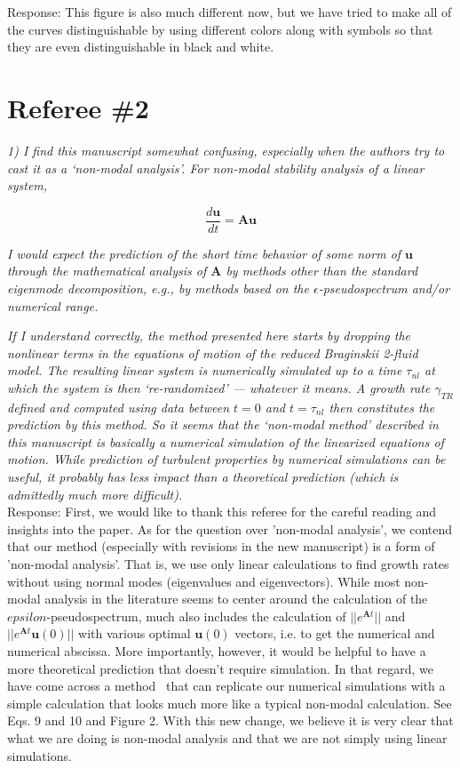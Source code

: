 \documentclass[12pt]{article}
\def\beq{\begin{equation}}
\def\eeq{\end{equation}}
\newcommand{\diff}[2]{\frac{d#1}{d#2}}
\begin{document}
Response: This figure is also much different now, but we have tried to make all of the curves distinguishable by using different colors along with symbols so that they are even distinguishable in black and white.


\section{Referee \#2}

\emph{1) I find this manuscript somewhat confusing, especially when the authors try to cast it as a ‘non-modal analysis’. For non-modal stability analysis of a linear system,}

\beq
\diff{\mathbf{u}}{t} = \mathbf{A u} \nonumber
\eeq

\emph{I would expect the prediction of the short time behavior of some norm of $\mathbf{u}$ through the mathematical analysis of $\mathbf{A}$
by methods other than the standard eigenmode decomposition, e.g., by methods based on the $\epsilon$-pseudospectrum and/or numerical range.}

\emph{If I understand correctly, the method presented here starts by dropping the nonlinear terms in
the equations of motion of the reduced Braginskii 2-fluid model. The resulting linear system is
numerically simulated up to a time $\tau_{nl}$ at which the system is then ‘re-randomized’ — whatever
it means. A growth rate $\gamma_{TR}$ defined and computed using data between $t = 0$ and $t = \tau_{nl}$ then
constitutes the prediction by this method. So it seems that the ‘non-modal method’ described in
this manuscript is basically a numerical simulation of the linearized equations of motion. While
prediction of turbulent properties by numerical simulations can be useful, it probably has less
impact than a theoretical prediction (which is admittedly much more difficult).} \\

Response: First, we would like to thank this referee for the careful reading and insights into the paper. As for the question over 'non-modal analysis', 
we contend that our method (especially with revisions in the new manuscript) is a form of 'non-modal analysis'. That is, we use only linear calculations to find growth rates without using normal modes (eigenvalues and eigenvectors). While most non-modal analysis in the literature seems to center around the calculation of the $epsilon$-pseudospectrum, much also includes the calculation of $||e^{\mathbf{A} t}||$ and $||e^{\mathbf{A} t} \mathbf{u}(0)||$ with various optimal $\mathbf{u}(0)$ vectors, i.e. to get the numerical and numerical abscissa. More importantly, however, it would be helpful to have a more theoretical prediction that doesn't require simulation. In that regard, we have come across a method~\cite{camargo1998} that can replicate our numerical simulations with a simple calculation that looks much more like a typical non-modal calculation. See Eqs. 9 and 10 and Figure 2. With this new change, we believe it is very clear that what we are doing is non-modal analysis and that we are not simply using linear simulations. \\
\end{document}
